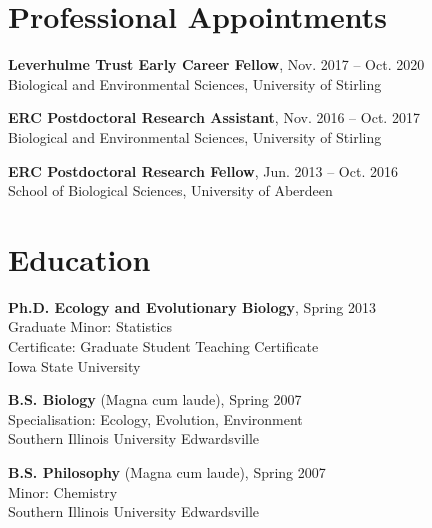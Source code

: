 \documentclass[letterpaper]{article}
\def\name{A. Bradley Duthie}
\renewenvironment{itemize}{
  \begin{list}{}{
    \setlength{\leftmargin}{1.5em}
  }
}{
  \end{list}
}
\begin{document}
\hrulefill

\vspace{0.16in}


\begin{minipage}{0.65\linewidth}
\section*{Professional Appointments}
\begin{itemize}
	\item{\bf Leverhulme Trust Early Career Fellow}, Nov. 2017 -- Oct. 2020 \\
	Biological and Environmental Sciences, University of Stirling
\end{itemize}
\begin{itemize}
	\item{\bf ERC Postdoctoral Research Assistant}, Nov. 2016 -- Oct. 2017 \\
	Biological and Environmental Sciences, University of Stirling
\end{itemize}
\begin{itemize}
	\item{\bf ERC Postdoctoral Research Fellow}, Jun. 2013 -- Oct. 2016 \\
	School of Biological Sciences, University of Aberdeen
\end{itemize}

\section*{Education}
\begin{itemize}
  \item {\bf Ph.D. Ecology and Evolutionary Biology}, Spring 2013 \\
	Graduate Minor: Statistics \\
	Certificate: Graduate Student Teaching Certificate \\
	Iowa State University
  \item {\bf B.S. Biology} (Magna cum laude), Spring 2007 \\
	Specialisation: Ecology, Evolution, Environment \\
	Southern Illinois University Edwardsville
  \item {\bf B.S. Philosophy} (Magna cum laude), Spring 2007 \\
	Minor: Chemistry \\
	Southern Illinois University Edwardsville
\end{itemize}


\end{minipage}
\end{document}
